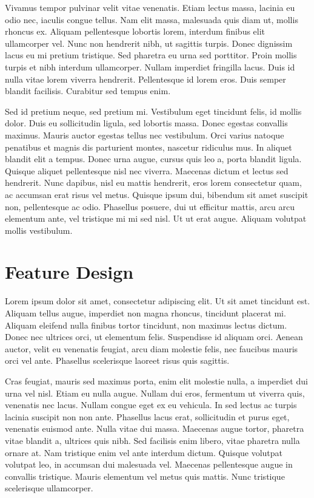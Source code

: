 \documentclass[conference]{IEEEtran}
\begin{document}
Vivamus tempor pulvinar velit vitae venenatis. Etiam lectus massa, lacinia eu odio nec, iaculis congue tellus. Nam elit massa, malesuada quis diam ut, mollis rhoncus ex. Aliquam pellentesque lobortis lorem, interdum finibus elit ullamcorper vel. Nunc non hendrerit nibh, ut sagittis turpis. Donec dignissim lacus eu mi pretium tristique. Sed pharetra eu urna sed porttitor. Proin mollis turpis et nibh interdum ullamcorper. Nullam imperdiet fringilla lacus. Duis id nulla vitae lorem viverra hendrerit. Pellentesque id lorem eros. Duis semper blandit facilisis. Curabitur sed tempus enim.

Sed id pretium neque, sed pretium mi. Vestibulum eget tincidunt felis, id mollis dolor. Duis eu sollicitudin ligula, sed lobortis massa. Donec egestas convallis maximus. Mauris auctor egestas tellus nec vestibulum. Orci varius natoque penatibus et magnis dis parturient montes, nascetur ridiculus mus. In aliquet blandit elit a tempus. Donec urna augue, cursus quis leo a, porta blandit ligula. Quisque aliquet pellentesque nisl nec viverra. Maecenas dictum et lectus sed hendrerit. Nunc dapibus, nisl eu mattis hendrerit, eros lorem consectetur quam, ac accumsan erat risus vel metus. Quisque ipsum dui, bibendum sit amet suscipit non, pellentesque ac odio. Phasellus posuere, dui ut efficitur mattis, arcu arcu elementum ante, vel tristique mi mi sed nisl. Ut ut erat augue. Aliquam volutpat mollis vestibulum. 

\section{Feature Design}

Lorem ipsum dolor sit amet, consectetur adipiscing elit. Ut sit amet tincidunt est. Aliquam tellus augue, imperdiet non magna rhoncus, tincidunt placerat mi. Aliquam eleifend nulla finibus tortor tincidunt, non maximus lectus dictum. Donec nec ultrices orci, ut elementum felis. Suspendisse id aliquam orci. Aenean auctor, velit eu venenatis feugiat, arcu diam molestie felis, nec faucibus mauris orci vel ante. Phasellus scelerisque laoreet risus quis sagittis.

Cras feugiat, mauris sed maximus porta, enim elit molestie nulla, a imperdiet dui urna vel nisl. Etiam eu nulla augue. Nullam dui eros, fermentum ut viverra quis, venenatis nec lacus. Nullam congue eget ex eu vehicula. In sed lectus ac turpis lacinia suscipit non non ante. Phasellus lacus erat, sollicitudin et purus eget, venenatis euismod ante. Nulla vitae dui massa. Maecenas augue tortor, pharetra vitae blandit a, ultrices quis nibh. Sed facilisis enim libero, vitae pharetra nulla ornare at. Nam tristique enim vel ante interdum dictum. Quisque volutpat volutpat leo, in accumsan dui malesuada vel. Maecenas pellentesque augue in convallis tristique. Mauris elementum vel metus quis mattis. Nunc tristique scelerisque ullamcorper.
\end{document}
